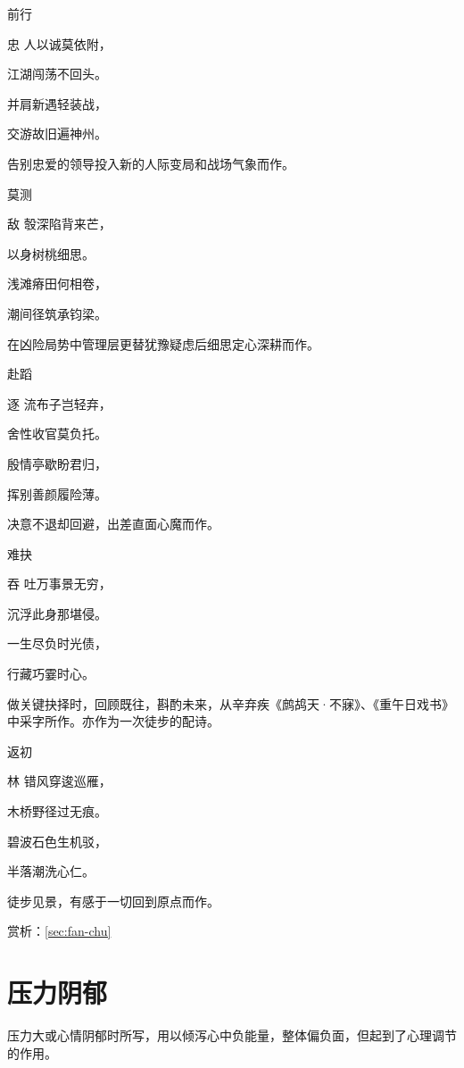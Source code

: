 \documentclass{article}
\newenvironment{poem}[3]{
\begin{minipage}{\textwidth}
\begin{pinyinscope}\begin{center}\Large\linespread{1.4}\selectfont #2\end{center}\end{pinyinscope}
\begin{pinyinscope}
	\begin{center}
	\Large\linespread{1.4}\rmfamily\selectfont #3
}{\end{center}
\end{pinyinscope}
\end{minipage}
}
\begin{document}
\begin{poem}{}{前行}
忠人以诚莫依附，

江湖闯荡不回头。

并肩新遇轻装战，

交游故旧遍神州。
\end{poem}

告别忠爱的领导投入新的人际变局和战场气象而作。

\begin{poem}{}{莫测}
敌彀深陷背来芒，

以身树桃细思{}。

浅滩瘠田何相卷，

潮间径筑承钧梁。
\end{poem}

在凶险局势中管理层更替犹豫疑虑后细思定心深耕而作。

\begin{poem}{}{赴蹈}
逐流布子岂轻弃，

舍性收官莫负托。

殷情亭歇盼君归，

挥别善颜履险薄。
\end{poem}

决意不退却回避，出差直面心魔而作。

\begin{poem}{}{难抉}
吞吐万事景无穷，

沉浮此身那堪侵。

一生尽负时光债，

行藏巧{}霎时心。
\end{poem}

做关键抉择时，回顾既往，斟酌未来，从辛弃疾《鹧鸪天·不寐》、《重午日戏书》中采字所作。亦作为一次徒步的配诗。

\begin{poem}{}{返初}
林错风穿逡巡雁，

木桥野径过无痕。

碧波石色生机驳，

半{}落潮洗心仁。
\end{poem}

徒步见景，有感于一切回到原点而作。

赏析：\ref{sec:fan-chu}

\section{压力阴郁}

压力大或心情阴郁时所写，用以倾泻心中负能量，整体偏负面，但起到了心理调节的作用。
\end{document}
